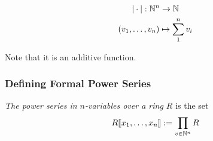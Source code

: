 \begin{gather*}
    \vert \cdot \vert : \mathbb{N}^n \rightarrow \mathbb{N}\\
    (v_1,\dots,v_n) \mapsto \sum_1^n v_i
\end{gather*}

Note that it is an additive function.
\subsubsection{Defining Formal Power Series} 

\begin{definition}
    \emph{The power series in $n$-variables over a ring $R$} is the set 
    $$
        R\llbracket x_1,\dots,x_n \rrbracket:=\prod_{v\in \mathbb{N}^n} R
    $$ 
\end{definition}

